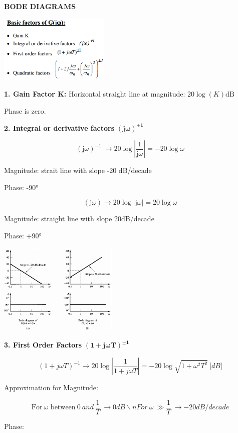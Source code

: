 \documentclass[a0,landscape]{article}
\begin{document}
\begin{multicols}{3}
\textbf{BODE DIAGRAMS}

\includegraphics[width=2.08800in,height=1.27279in]{media/image20.png}

\textbf{1. Gain Factor K:} Horizontal straight line at magnitude:
\(20\log{(K)}\text{dB}\)

Phase is zero.

\textbf{2. Integral or derivative factors}
\(\mathbf{(j\omega)}^{\mathbf{\pm 1}}\)

\[\left( \text{j}\omega \right)^{- 1}\  \rightarrow 20\log{\left| \frac{1}{\text{j}\omega} \right| = - 20\log\omega}\]

Magnitude: strait line with slope -20 dB/decade

Phase: -90°

\[\left( \text{j}\omega \right) \rightarrow 20\log\left| \text{j}\omega \right| = 20\log\omega\]

Magnitude: straight line with slope 20dB/decade

Phase: +90°

\includegraphics[width=2.24800in,height=1.72199in]{media/image21.png}

\textbf{3. First Order Factors}
\(\left( \mathbf{1 + j\omega T} \right)^{\mathbf{\pm 1}}\)

\[\left( 1 + j\omega T \right)^{- 1} \rightarrow 20\log\left| \frac{1}{1 + j\omega T} \right| = - 20\log\sqrt{1 + \omega^{2}T^{2}}\ \lbrack dB\rbrack\]

Approximation for Magnitude:

\[{\text{For}\ \omega \text{\ between}\ 0\ and\ \frac{1}{T}\  \rightarrow 0 dB\backslash n}{For\ \omega\  \gg \frac{1}{T}\  \rightarrow - 20dB/decade}\]

Phase:


\end{multicols}
\end{document}
